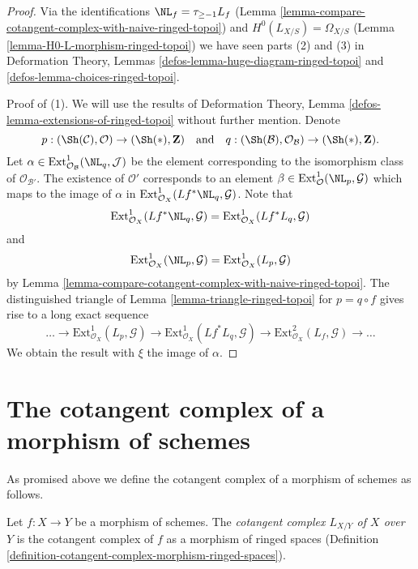 \begin{proof}
Via the identifications $\NL_f = \tau_{\geq -1}L_f$
(Lemma \ref{lemma-compare-cotangent-complex-with-naive-ringed-topoi}) and
$H^0(L_{X/S}) = \Omega_{X/S}$
(Lemma \ref{lemma-H0-L-morphism-ringed-topoi})
we have seen parts (2) and (3) in
Deformation Theory, Lemmas \ref{defos-lemma-huge-diagram-ringed-topoi} and
\ref{defos-lemma-choices-ringed-topoi}.

\medskip\noindent
Proof of (1). We will use the results of
Deformation Theory, Lemma \ref{defos-lemma-extensions-of-ringed-topoi}
without further mention. Denote
$$
p : (\Sh(\mathcal{C}), \mathcal{O}) \to (\Sh(*), \mathbf{Z})
\quad\text{and}\quad
q : (\Sh(\mathcal{B}), \mathcal{O}_\mathcal{B}) \to (\Sh(*), \mathbf{Z}).
$$
Let $\alpha \in \text{Ext}^1_{\mathcal{O}_\mathcal{B}}(\NL_q, \mathcal{J})$
be the element corresponding to the isomorphism class of
$\mathcal{O}_{\mathcal{B}'}$. The existence of $\mathcal{O}'$
corresponds to an element
$\beta \in \text{Ext}_\mathcal{O}^1(\NL_p, \mathcal{G})$
which maps to the image of $\alpha$ in
$\text{Ext}^1_{\mathcal{O}_X}(Lf^*\NL_q, \mathcal{G})$.
Note that
$$
\text{Ext}^1_{\mathcal{O}_X}(Lf^*\NL_q, \mathcal{G}) =
\text{Ext}^1_{\mathcal{O}_X}(Lf^*L_q, \mathcal{G})
$$
and
$$
\text{Ext}^1_{\mathcal{O}_X}(\NL_p, \mathcal{G}) =
\text{Ext}^1_{\mathcal{O}_X}(L_p, \mathcal{G})
$$
by Lemma \ref{lemma-compare-cotangent-complex-with-naive-ringed-topoi}.
The distinguished triangle of Lemma \ref{lemma-triangle-ringed-topoi}
for $p = q \circ f$ gives rise to a long exact sequence
$$
\ldots \to
\text{Ext}^1_{\mathcal{O}_X}(L_p, \mathcal{G}) \to
\text{Ext}^1_{\mathcal{O}_X}(Lf^*L_q, \mathcal{G}) \to
\text{Ext}^2_{\mathcal{O}_X}(L_f, \mathcal{G}) \to \ldots
$$
We obtain the result with $\xi$ the image of $\alpha$.
\end{proof}












\section{The cotangent complex of a morphism of schemes}
\label{section-cotangent-morphism-schemes}

\noindent
As promised above we define the cotangent complex of a morphism of
schemes as follows.

\begin{definition}
\label{definition-cotangent-morphism-schemes}
Let $f : X \to Y$ be a morphism of schemes. The {\it cotangent complex
$L_{X/Y}$ of $X$ over $Y$} is the cotangent complex of $f$ as a
morphism of ringed spaces
(Definition \ref{definition-cotangent-complex-morphism-ringed-spaces}).
\end{definition}

